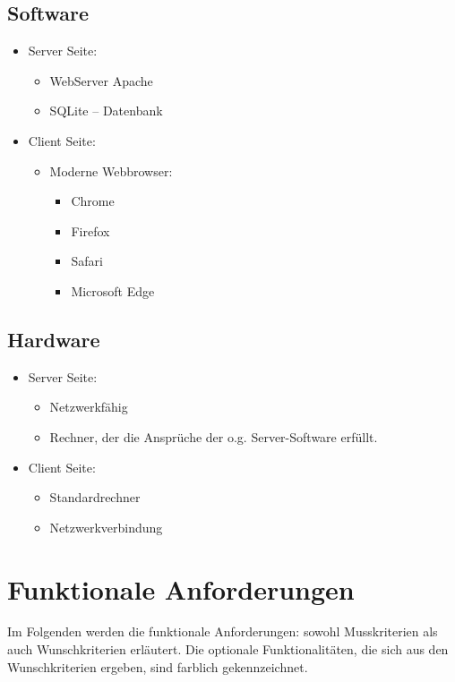 \documentclass[parskip=full,11pt]{scrartcl}
\begin{document}
\subsection{Software}
\begin{itemize}[itemsep=0pt]
\item Server Seite:
	\begin{itemize}
	\item WebServer Apache 
	\item SQLite – Datenbank
	\end{itemize}
\item Client Seite:
	\begin{itemize}
	\item Moderne Webbrowser:
		\begin{itemize}
		\item Chrome
		\item Firefox
		\item Safari
		\item Microsoft Edge
		\end{itemize}
	
	\end{itemize}
\end{itemize}

\subsection{Hardware}
\begin{itemize}[itemsep=0pt]

	\item Server Seite:
	\begin{itemize}
	\item Netzwerkfähig
	\item Rechner, der die Ansprüche der o.g. Server-Software erfüllt.
	\end{itemize}
	\item Client Seite:
	\begin{itemize}
	\item Standardrechner
	\item Netzwerkverbindung
	\end{itemize}
\end{itemize}
\newpage


\section{Funktionale Anforderungen}
Im Folgenden werden die funktionale Anforderungen: sowohl Musskriterien als auch Wunschkriterien erläutert. Die optionale Funktionalitäten, die sich aus den Wunschkriterien ergeben, sind \colorbox{shadecolor}{farblich gekennzeichnet}.
\end{document}
